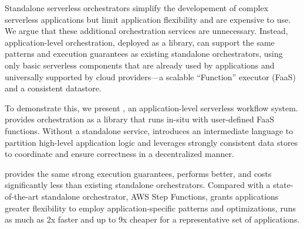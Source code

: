 Standalone serverless orchestrators simplify the developement of complex
serverless applications but limit application flexibility and are expensive to
use. We argue that these additional orchestration services are unnecessary.
Instead, application-level orchestration, deployed as a library, can support
the same patterns and execution guarantees as existing standalone
orchestrators, using only basic serverless components that are already used by
applications and universally supported by cloud providers---a scalable
``Function'' executor (FaaS) and a consistent datastore.


To demonstrate this, we present \name{}, an application-level serverless
workflow system. \name{} provides orchestration as a library that runs in-situ
with user-defined FaaS functions. Without a standalone service, \name{}
introduces an intermediate language to partition high-level application logic
and leverages strongly consistent data stores to coordinate and ensure
correctness in a decentralized manner.

\name{} provides the same strong execution guarantees, performs better, and
costs significantly less than existing standalone orchestrators. Compared with
a state-of-the-art standalone orchestrator, AWS Step Functions, \name{} grants
applications greater flexibility to employ application-specific patterns and
optimizations, runs as much as 2x faster and up to 9x cheaper for a
representative set of applications.